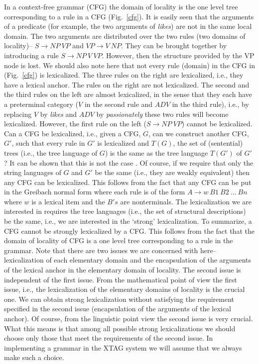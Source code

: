 In a context-free grammar (CFG) the domain of locality is the one level
tree corresponding to a rule in a CFG (Fig.~\ref{cfg}). It is easily
seen that the arguments of a predicate (for example, the two arguments
of {\it likes}) are not in the same local domain. The two arguments are
distributed over the two rules (two domains of locality)-- $S
\rightarrow NP \ VP$ and $VP \rightarrow V \ NP$. They can be brought
together by introducing a rule $S \rightarrow NP \ V \ VP $. However,
then the structure provided by the VP node is lost. We should also note
here that not every rule (domain) in the CFG in (Fig.~\ref{cfg}) is
lexicalized. The three rules on the right are lexicalized, i.e., they
have a lexical anchor. The rules on the right are not lexicalized. The
second and the third rules on the left are almost lexicalized, in the
sense that they each have a preterminal category ($V$ in the second
rule and $ADV$ in the third rule), i.e., by replacing $V$ by {\it
likes} and $ADV$ by {\it passionately} these two rules will become
lexicalized. However, the first rule on the left ($S \rightarrow NP
\ VP$) cannot be lexicalized. Can a CFG be lexicalized, i.e., given a
CFG, $G$, can we construct another CFG, $G'$, such that every rule in
$G'$ is lexicalized and $T(G)$, the set of (sentential) trees (i.e.,
the tree language of $G$) is the same as the tree language $T(G')$ of
$G'$? It can be shown that this is not the case \cite{joshischabes96}.
Of course, if we require that only the string languages of $G$ and $G'$
be the same (i.e., they are weakly equivalent) then any CFG can be
lexicalized. This follows from the fact that any CFG can be put in the
Greibach normal form where each rule is of the form $ A \rightarrow w
\ B1 \ B2 \ ... \ Bn$ where $w$ is a lexical item and the $B's$ are
nonterminals. The lexicalization we are interested in requires the
tree languages (i.e., the set of structural descriptions) be the same,
i.e., we are interested in the `strong' lexicalization. To summarize, a
CFG cannot be strongly lexicalized by a CFG. This follows from the fact
that the domain of locality of CFG is a one level tree corresponding to
a rule in the grammar. Note that there are two issues we are concerned
with here-- lexicalization of each elementary domain and the
encapsulation of the arguments of the lexical anchor in the elementary
domain of locality. The second issue is independent of the first issue.
From the mathematical point of view the first issue, i.e., the
lexicalization of the elementary domains of locality is the crucial
one. We can obtain strong lexicalization without satisfying the
requirement specified in the second issue (encapsulation of the
arguments of the lexical anchor). Of course, from the linguistic point
view the second issue is very crucial. What this means is that among
all possible strong lexicalizations we should choose only those that
meet the requirements of the second issue. In implementing a grammar in
the XTAG system we will assume that we always make such a choice.


